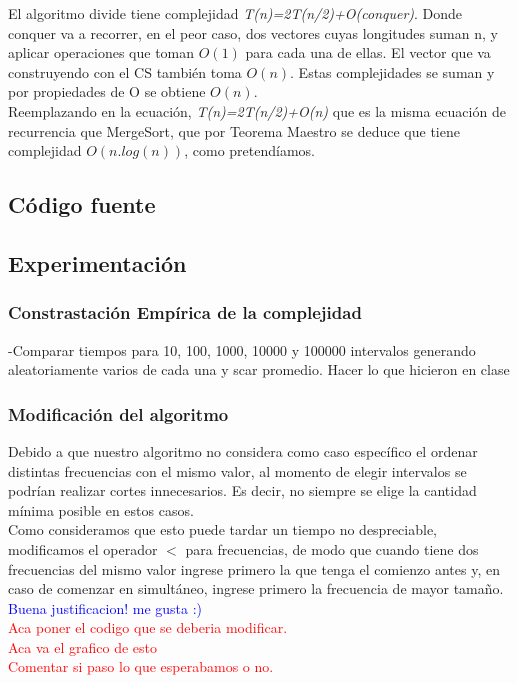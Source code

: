 El algoritmo divide tiene complejidad \emph{T(n)=2T(n/2)+O(conquer)}. Donde conquer va a recorrer, en el peor caso, dos vectores cuyas longitudes suman n, y aplicar operaciones que toman $O(1)$ para cada una de ellas. El vector que va construyendo con el CS tambi\'en toma $O(n)$. Estas complejidades se suman y por propiedades de O se obtiene $O(n)$.\\

Reemplazando en la ecuaci\'on, \emph{T(n)=2T(n/2)+O(n)} que es la misma ecuaci\'on de recurrencia que MergeSort, que por Teorema Maestro se deduce que tiene complejidad $O(n.log(n))$, como pretend\'iamos.

\newpage
\subsection{C\'odigo fuente}
\newpage
\subsection{Experimentaci\'on}

\subsubsection{Constrastaci\'on Emp\'irica de la complejidad}
-Comparar tiempos para 10, 100, 1000, 10000 y 100000 intervalos generando aleatoriamente varios de cada una y scar promedio. Hacer lo que hicieron en clase\\


\newpage
\subsubsection{Modificaci\'on del algoritmo}
Debido a que nuestro algoritmo no considera como caso espec\'ifico el ordenar distintas frecuencias con el mismo valor, al momento de elegir intervalos se podr\'ian realizar cortes innecesarios. Es decir, no siempre se elige la cantidad m\'inima posible en estos casos.\\

Como consideramos que esto puede tardar un tiempo no despreciable, modificamos el operador $<$ para frecuencias, de modo que cuando tiene dos frecuencias del mismo valor ingrese primero la que tenga el comienzo antes y, en caso de comenzar en simult\'aneo, ingrese primero la frecuencia de mayor tama\~no.\\

\textcolor{blue}{Buena justificacion! me gusta :)}\\

\textcolor{red}{Aca poner el codigo que se deberia modificar.}\\

\textcolor{red}{Aca va el grafico de esto}\\

\textcolor{red}{Comentar si paso lo que esperabamos o no.}
